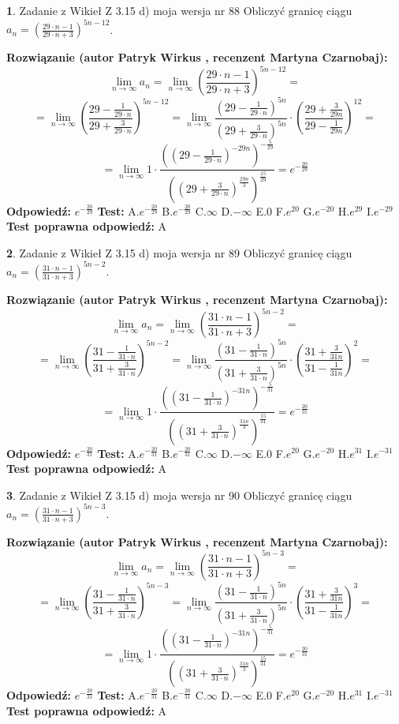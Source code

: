 \documentclass[12pt, a4paper]{article}
\theoremstyle{definition} %
\newtheorem{zad}{}
\newcommand{\zadStart}[1]{\begin{zad}#1\newline}
\newcommand{\zadStop}{\end{zad}}
\newcommand{\rozwStart}[2]{\noindent \textbf{Rozwiązanie (autor #1 , recenzent #2): }\newline}
\newcommand{\rozwStop}{\newline}
\newcommand{\odpStart}{\noindent \textbf{Odpowiedź:}\newline}
\newcommand{\odpStop}{\newline}
\newcommand{\testStart}{\noindent \textbf{Test:}\newline}
\newcommand{\testStop}{\newline}
\newcommand{\kluczStart}{\noindent \textbf{Test poprawna odpowiedź:}\newline}
\newcommand{\kluczStop}{\newline}
\begin{document}
\zadStart{Zadanie z Wikieł Z 3.15 d) moja wersja nr 88}
Obliczyć granicę ciągu $a_{n}=(\frac{29\cdot n - 1}{29 \cdot n + 3})^{5n-12}$.
\zadStop
\rozwStart{Patryk Wirkus}{Martyna Czarnobaj}
$$\lim\limits_{n\to\infty} a_{n} = \lim\limits_{n\to\infty}(\frac{29\cdot n - 1}{29 \cdot n + 3})^{5n-12}=$$
$$=\lim\limits_{n\to\infty}(\frac{29 - \frac{1}{29\cdot n}}{29 + \frac{3}{29 \cdot n}})^{5n-12}=\lim\limits_{n\to\infty}\frac{(29 - \frac{1}{29\cdot n})^{5n}}{(29 + \frac{3}{29\cdot n})^{5n}} \cdot (\frac{29+\frac{3}{29n}}{29-\frac{1}{29n}})^{12}=$$
$$=\lim\limits_{n\to\infty} 1 \cdot \frac{((29-\frac{1}{29 \cdot n})^{-29n})^{-\frac{5}{29}}}{((29+\frac{3}{29 \cdot n})^{\frac{29n}{3}})^{\frac{15}{29}}} =e^{-\frac{20}{29}}$$
\rozwStop
\odpStart
$e^{-\frac{20}{29}}$
\odpStop
\testStart
A.$ e^{-\frac{20}{29}}$
B.$ e^{-\frac{20}{29}}$
C.$\infty$
D.$-\infty$
E.$0$
F.$e^{20}$
G.$e^{-20}$
H.$e^{29}$
I.$e^{-29}$
\testStop
\kluczStart
A
\kluczStop



\zadStart{Zadanie z Wikieł Z 3.15 d) moja wersja nr 89}
Obliczyć granicę ciągu $a_{n}=(\frac{31\cdot n - 1}{31 \cdot n + 3})^{5n-2}$.
\zadStop
\rozwStart{Patryk Wirkus}{Martyna Czarnobaj}
$$\lim\limits_{n\to\infty} a_{n} = \lim\limits_{n\to\infty}(\frac{31\cdot n - 1}{31 \cdot n + 3})^{5n-2}=$$
$$=\lim\limits_{n\to\infty}(\frac{31 - \frac{1}{31\cdot n}}{31 + \frac{3}{31 \cdot n}})^{5n-2}=\lim\limits_{n\to\infty}\frac{(31 - \frac{1}{31\cdot n})^{5n}}{(31 + \frac{3}{31\cdot n})^{5n}} \cdot (\frac{31+\frac{3}{31n}}{31-\frac{1}{31n}})^{2}=$$
$$=\lim\limits_{n\to\infty} 1 \cdot \frac{((31-\frac{1}{31 \cdot n})^{-31n})^{-\frac{5}{31}}}{((31+\frac{3}{31 \cdot n})^{\frac{31n}{3}})^{\frac{15}{31}}} =e^{-\frac{20}{31}}$$
\rozwStop
\odpStart
$e^{-\frac{20}{31}}$
\odpStop
\testStart
A.$ e^{-\frac{20}{31}}$
B.$ e^{-\frac{20}{31}}$
C.$\infty$
D.$-\infty$
E.$0$
F.$e^{20}$
G.$e^{-20}$
H.$e^{31}$
I.$e^{-31}$
\testStop
\kluczStart
A
\kluczStop



\zadStart{Zadanie z Wikieł Z 3.15 d) moja wersja nr 90}
Obliczyć granicę ciągu $a_{n}=(\frac{31\cdot n - 1}{31 \cdot n + 3})^{5n-3}$.
\zadStop
\rozwStart{Patryk Wirkus}{Martyna Czarnobaj}
$$\lim\limits_{n\to\infty} a_{n} = \lim\limits_{n\to\infty}(\frac{31\cdot n - 1}{31 \cdot n + 3})^{5n-3}=$$
$$=\lim\limits_{n\to\infty}(\frac{31 - \frac{1}{31\cdot n}}{31 + \frac{3}{31 \cdot n}})^{5n-3}=\lim\limits_{n\to\infty}\frac{(31 - \frac{1}{31\cdot n})^{5n}}{(31 + \frac{3}{31\cdot n})^{5n}} \cdot (\frac{31+\frac{3}{31n}}{31-\frac{1}{31n}})^{3}=$$
$$=\lim\limits_{n\to\infty} 1 \cdot \frac{((31-\frac{1}{31 \cdot n})^{-31n})^{-\frac{5}{31}}}{((31+\frac{3}{31 \cdot n})^{\frac{31n}{3}})^{\frac{15}{31}}} =e^{-\frac{20}{31}}$$
\rozwStop
\odpStart
$e^{-\frac{20}{31}}$
\odpStop
\testStart
A.$ e^{-\frac{20}{31}}$
B.$ e^{-\frac{20}{31}}$
C.$\infty$
D.$-\infty$
E.$0$
F.$e^{20}$
G.$e^{-20}$
H.$e^{31}$
I.$e^{-31}$
\testStop
\kluczStart
A
\kluczStop
\end{document}

